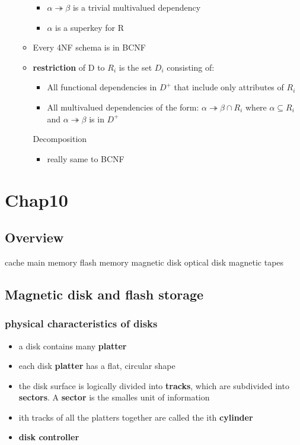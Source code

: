 \documentclass[11pt]{article}
\begin{document}
\begin{itemize}
\begin{itemize}
\begin{itemize}
\item $\alpha\twoheadrightarrow\beta$ is a trivial multivalued dependency
\item $\alpha$ is a superkey for R
\end{itemize}
\item Every 4NF schema is in BCNF
\item \textbf{restriction} of D to $R_i$ is the set $D_i$ consisting of:
\begin{itemize}
\item All functional dependencies in $D^+$ that include only attributes of $R_i$
\item All multivalued dependencies of the form:
$\alpha\twoheadrightarrow\beta\cap R_i$
where $\alpha\subseteq R_i$ and $\alpha\twoheadrightarrow\beta$ is in $D^+$
\end{itemize}
\item[{Decomposition}] \begin{itemize}
\item really same to BCNF
\end{itemize}
\end{itemize}
\end{itemize}
\section{Chap10}
\label{sec-14}
\subsection{Overview}
\label{sec-14-1}
cache
main memory
flash memory
magnetic disk
optical disk
magnetic tapes
\subsection{Magnetic disk and flash storage}
\label{sec-14-2}
\subsubsection{physical characteristics of disks}
\label{sec-14-2-1}
\begin{itemize}
\item a disk contains many \textbf{platter}
\item each disk \textbf{platter} has a flat, circular shape
\item the disk surface is logically divided into \textbf{tracks}, which are subdivided into
\textbf{sectors}. A \textbf{sector} is the smalles unit of information
\item ith tracks of all the platters together are called the ith \textbf{cylinder}
\item \textbf{disk controller}
\end{itemize}
\end{document}
